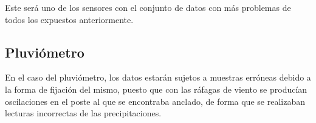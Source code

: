 Este será uno de los sensores con el conjunto de datos con más problemas de todos los 
expuestos anteriormente.

\newpage
\subsection{Pluviómetro}


En el caso del pluviómetro, los datos estarán sujetos a muestras erróneas debido a la forma
de fijación del mismo, puesto que con las ráfagas de viento se producían oscilaciones
en el poste al que se encontraba anclado, de forma que se realizaban lecturas incorrectas
de las precipitaciones.
